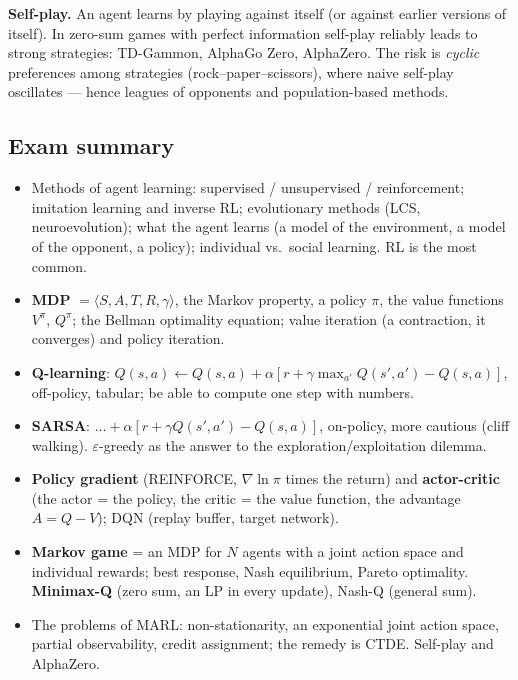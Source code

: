 \documentclass[11pt,a4paper]{article}
\theoremstyle{definition}
\begin{document}
\textbf{Self-play.} An agent learns by playing against itself (or against earlier versions of
itself). In zero-sum games with perfect information self-play reliably leads to strong
strategies: TD-Gammon, AlphaGo Zero, AlphaZero. The risk is \emph{cyclic} preferences among
strategies (rock--paper--scissors), where naive self-play oscillates --- hence leagues of
opponents and population-based methods.

\subsection{Exam summary}

\begin{itemize}
\item Methods of agent learning: supervised / unsupervised / reinforcement; imitation learning
  and inverse RL; evolutionary methods (LCS, neuroevolution); what the agent learns (a model of
  the environment, a model of the opponent, a policy); individual vs.\ social learning. RL is
  the most common.
\item \textbf{MDP} $= \langle S,A,T,R,\gamma\rangle$, the Markov property, a policy $\pi$, the
  value functions $V^\pi$, $Q^\pi$; the Bellman optimality equation; value iteration (a
  contraction, it converges) and policy iteration.
\item \textbf{Q-learning}:
  $Q(s,a) \leftarrow Q(s,a) + \alpha[r + \gamma\max_{a'}Q(s',a') - Q(s,a)]$,
  off-policy, tabular; be able to compute one step with numbers.
\item \textbf{SARSA}: $\dots + \alpha[r + \gamma Q(s',a') - Q(s,a)]$, on-policy, more cautious
  (cliff walking). $\varepsilon$-greedy as the answer to the exploration/exploitation dilemma.
\item \textbf{Policy gradient} (REINFORCE, $\nabla \ln \pi$ times the return) and
  \textbf{actor-critic} (the actor = the policy, the critic = the value function, the advantage
  $A = Q - V$); DQN (replay buffer, target network).
\item \textbf{Markov game} = an MDP for $N$ agents with a joint action space and individual
  rewards; best response, Nash equilibrium, Pareto optimality.
  \textbf{Minimax-Q} (zero sum, an LP in every update), Nash-Q (general sum).
\item The problems of MARL: non-stationarity, an exponential joint action space, partial
  observability, credit assignment; the remedy is CTDE. Self-play and AlphaZero.
\end{itemize}
\end{document}
